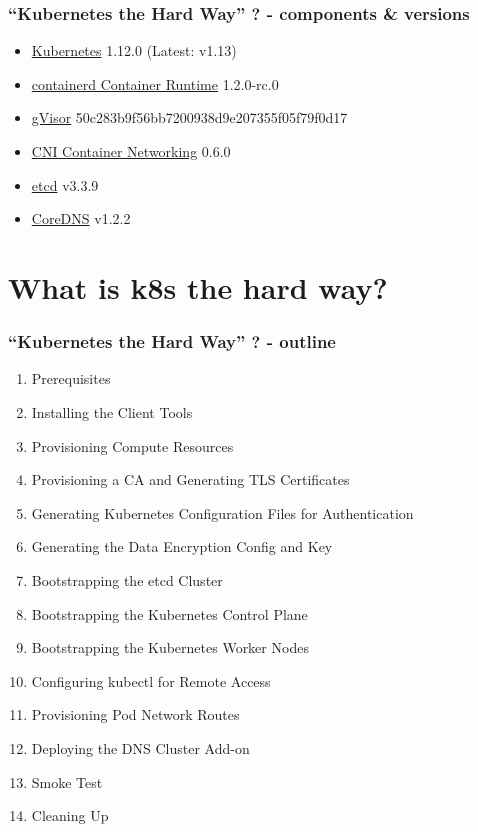 \documentclass[aspectratio=169,11pt,hyperref={colorlinks=true}]{beamer}
\begin{document}
\begin{frame}
  \frametitle{``Kubernetes the Hard Way'' ? - components \& versions}
  \begin{itemize}
    \item \href{https://github.com/kubernetes/kubernetes}{Kubernetes} 1.12.0 (Latest: v1.13)
    \item \href{https://github.com/containerd/containerd}{containerd Container Runtime} 1.2.0-rc.0
    \item \href{https://github.com/google/gvisor}{gVisor} 50c283b9f56bb7200938d9e207355f05f79f0d17
    \item \href{https://github.com/containernetworking/cni}{CNI Container Networking} 0.6.0
    \item \href{https://github.com/etcd-io/etcd}{etcd} v3.3.9
    \item \href{https://github.com/coredns/coredns}{CoreDNS} v1.2.2

  \end{itemize}
\end{frame}


\section{What is k8s the hard way?}
\begin{frame}
  \frametitle{``Kubernetes the Hard Way'' ? - outline}
  \begin{enumerate}
    \item Prerequisites
    \item Installing the Client Tools
    \item Provisioning Compute Resources
    \item Provisioning a CA and Generating TLS Certificates
    \item Generating Kubernetes Configuration Files for Authentication
    \item Generating the Data Encryption Config and Key
    \item Bootstrapping the etcd Cluster
    \item Bootstrapping the Kubernetes Control Plane
    \item Bootstrapping the Kubernetes Worker Nodes
    \item Configuring kubectl for Remote Access
    \item Provisioning Pod Network Routes
    \item Deploying the DNS Cluster Add-on
    \item Smoke Test
    \item Cleaning Up
  \end{enumerate}
\end{frame}
\end{document}
